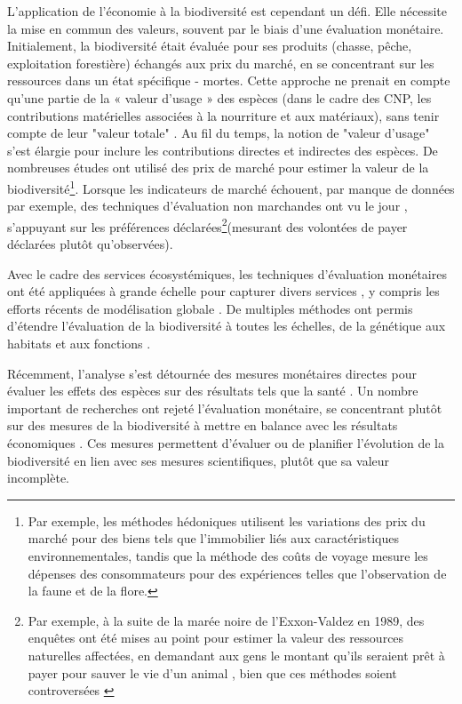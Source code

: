 L'application de l'économie à la biodiversité est cependant un défi. Elle nécessite la mise en commun des valeurs, souvent par le biais d'une évaluation monétaire. Initialement, la biodiversité était évaluée pour ses produits (chasse, pêche, exploitation forestière) échangés aux prix du marché, en se concentrant sur les ressources dans un état spécifique - mortes. Cette approche ne prenait en compte qu'une partie de la « valeur d'usage » des espèces (dans le cadre des CNP, les contributions matérielles associées à la nourriture et aux matériaux), sans tenir compte de leur "valeur totale" \citep{Krutilla1967}. Au fil du temps, la notion de "valeur d'usage" s'est élargie pour inclure les contributions directes et indirectes des espèces.  De nombreuses études ont utilisé des prix de marché pour estimer la valeur de la biodiversité\footnote{ Par exemple, les méthodes hédoniques \citep{rosen_hedonic_1974} utilisent les variations des prix du marché pour des biens tels que l'immobilier liés aux caractéristiques environnementales, tandis que la méthode des coûts de voyage \citep{clawson_economics_1967, bhandari_willingness_2010} mesure les dépenses des consommateurs pour des expériences telles que l'observation de la faune et de la flore.}. Lorsque les indicateurs de marché échouent, par manque de données par exemple, des techniques d'évaluation non marchandes ont vu le jour \citep{carson_contingent_2012}, s'appuyant sur les préférences déclarées\footnote{Par exemple, à la suite de la marée noire de l'Exxon-Valdez en 1989, des enquêtes ont été mises au point pour estimer la valeur des ressources naturelles affectées, en demandant aux gens le montant qu'ils seraient prêt à payer pour sauver le vie d'un animal \citep{carson_contingent_1992, arrow_report_1993, carson_contingent_2003}, bien que ces méthodes soient controversées \citep{Diamond94}}(mesurant des volontées de payer déclarées plutôt qu'observées). 

Avec le cadre des services écosystémiques, les techniques d'évaluation monétaires ont été appliquées à grande échelle pour capturer divers services \citep{Costanza1997}, y compris les efforts récents de modélisation globale \citep{giglio_economics_2024}. De multiples méthodes ont permis d'étendre l'évaluation de la biodiversité à toutes les échelles, de la génétique aux habitats et aux fonctions \citep{bartkowski_capturing_2015}.

Récemment, l'analyse s'est détournée des mesures monétaires directes pour évaluer les effets des espèces sur des résultats tels que la santé \citep{frank_social_nodate,frank_economic_2024}. Un nombre important de recherches ont rejeté l'évaluation monétaire, se concentrant plutôt sur des mesures de la biodiversité à mettre en balance avec les résultats économiques \citep{Mouysset2011, Watzold2016a}.  Ces mesures permettent d'évaluer ou de planifier l'évolution de la biodiversité en lien avec ses mesures scientifiques, plutôt que sa valeur incomplète. 

